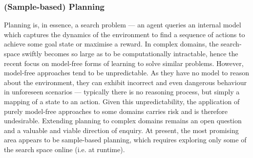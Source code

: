 \subsubsection{(Sample-based) Planning}
 Planning is, in essence, a search problem --- an agent queries an internal model which captures the dynamics of the environment to find a sequence of actions to achieve some goal state or maximise a reward. In complex domains, the search-space swiftly becomes so large as to be computationally intractable, hence the recent focus on model-free forms of learning to solve similar problems. However, model-free approaches tend to be unpredictable. As they have no model to reason about the environment, they can exhibit incorrect and even dangerous behaviour in unforeseen scenarios --- typically there is no reasoning process, but simply a mapping of a state to an action. Given this unpredictability, the application of purely model-free approaches to some domains carries risk and is therefore undesirable. Extending planning to complex domains remains an open question and a valuable and viable direction of enquiry. At present, the most promising area appears to be sample-based planning, which requires exploring only some of the search space online (i.e. at runtime).  

